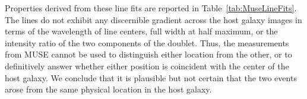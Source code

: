 Properties derived from these line fits are reported in
Table~\ref{tab:MuseLineFits}. The  lines do not exhibit
any discernible gradient across the host galaxy images in terms of the
wavelength of line centers, full width at half maximum, or the
intensity ratio of the two components of the doublet.  Thus, the
 measurements from MUSE cannot be used to
distinguish either \spock location from the other, or to definitively
answer whether either position is coincident with the center of the
host galaxy.  We conclude that it is plausible but not certain that
the two \spock events arose from the same physical location in the
host galaxy.





